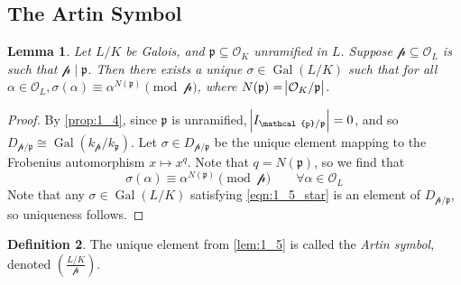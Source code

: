 \documentclass[11pt]{article}
\theoremstyle{definition}
\newtheorem{definition}{Definition}[section]
\theoremstyle{plain}
\newtheorem{lemma}[definition]{Lemma}
\theoremstyle{remark}
\DeclareMathOperator{\Gal}{Gal}
\newcommand{\cO}{\mathcal{O}}
\newcommand{\cp}{\mathcal{p}}
\newcommand{\fp}{\mathfrak{p}}
\newcommand{\leg}[2]{\left(\frac{#1}{#2}\right)}
\begin{document}
\subsection{The Artin Symbol}

\begin{lemma}\label{lem:1_5}
    Let $L/K$ be Galois, and $\fp \subseteq \cO_K$ unramified in $L$. Suppose $\cp \subseteq \cO_L$ is such that $\cp \mid \fp$. Then there exists a unique $\sigma \in \Gal(L/K)$ such that for all $\alpha \in \cO_L, \sigma(\alpha) \equiv \alpha^{N(\fp)} \pmod{\cp}$, where $N(\fp) = \abs{\cO_K / \fp}$.
\end{lemma}
\begin{proof}
    By \autoref{prop:1_4}, since $\fp$ is unramified, $\abs{I_{\cp / \fp}} = 0$, and so $D_{\cp / \fp} \cong \Gal(k_\cp / k_\fp)$. Let $\sigma \in D_{\cp / \fp}$ be the unique element mapping to the Frobenius automorphism $x \mapsto x^q$. Note that $q = N(\fp)$, so we find that
    \begin{equation}\label{eqn:1_5_star}
        \sigma(\alpha) \equiv \alpha^{N(\fp)} \pmod{\cp} \qquad \forall \alpha \in \cO_L
    \end{equation}
    Note that any $\sigma \in \Gal(L/K)$ satisfying \eqref{eqn:1_5_star} is an element of $D_{\cp / \fp}$, so uniqueness follows.
\end{proof}

\begin{definition}\label{def:1_6}
    The unique element from \autoref{lem:1_5} is called the \emph{Artin symbol}, denoted $\leg{L/K}{\cp}$.
\end{definition}
\end{document}
